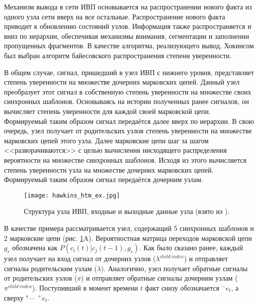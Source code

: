 Механизм вывода в сети ИВП основывается на распространении нового факта из одного узла сети вверх на все остальные. Распространение нового факта приводит к обновлению состояний узлов. Информация также распространяется и вниз по иерархии, обеспечивая механизмы внимания, сегментации и заполнении пропущенных фрагментов. В качестве алгоритма, реализующего вывод, Хокинсом был выбран алгоритм байесовского распространения степени уверенности.

В общем случае, сигнал, пришедший в узел ИВП с нижнего уровня, представляет степень уверенности на множестве дочерних марковских цепей. Данный узел преобразует этот сигнал в собственную степень уверенности на множестве своих синхронных шаблонов. Основываясь на истории полученных ранее сигналов, он вычисляет степень уверенности для каждой своей марковской цепи. Формируемый таким образом сигнал передаётся далее вверх по иерархии. В свою очередь, узел получает от родительских узлов степень уверенности на множестве марковских цепей этого узла. Далее марковские цепи шаг за шагом <<разворачиваются>> с целью вычисления нисходящего распределения вероятности на множестве синхронных шаблонов. Исходя из этого вычисляется степень уверенности узла на множестве дочерних марковских цепей. Формируемый таким образом сигнал передаётся дочерним узлам.

\begin{figure}[h]
	\centering
	\texttt{[image: hawkins\_htm\_ex.jpg]}
	\caption{Структура узла ИВП, входные и выходные данные узла (взято из \cite{Hawkins2009}).}
	\label{fg:hawkins_htm_ex}
\end{figure}

В качестве примера рассматривается узел, содержащий 5 синхронных шаблонов и 2 марковские цепи (рис. \ref{fg:hawkins_htm_ex}A). Вероятностная матрица переходов марковской цепи $g_r$ обозначена как $P(c_i(t)|c_j(t-1),g_r)$. Как было сказано ранее, каждый узел получает на вход сигнал от дочерних узлов ($\lambda^{child\ index}$) и отправляет сигналы родительским узлам ($\lambda$). Аналогично, узел получает обратные сигналы от родительских узлов ($\pi$) и отправляет обратные сигналы дочерним узлам ($\pi^{child\ index}$). Поступивший в момент времени $t$ факт снизу обозначается ${}^-e_t$, а сверху "--- ${}^+e_t$.

